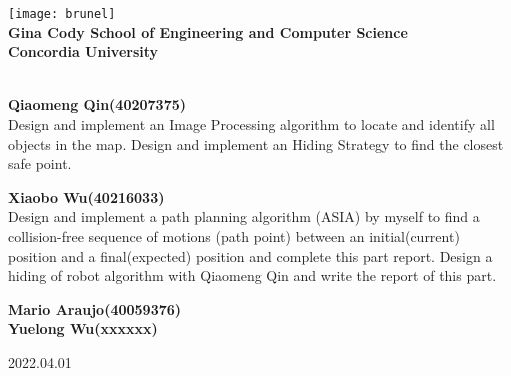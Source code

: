 \begin{titlepage}
  \begin{center}
    \texttt{[image: brunel]}\\[1cm]

    \textbf{\large Gina Cody School of Engineering and Computer Science}\\[0.5cm]

      \textbf{\LARGE Concordia University}\\[0.75cm]
      \textbf{\LARGE \Title}\\[0.75cm]

  \end{center}

\textbf{\large Qiaomeng Qin(40207375)}\\[0.5cm]
Design and implement an Image Processing algorithm to locate and identify all objects in the map. Design and implement an Hiding Strategy to find the closest safe point.

\textbf{\large Xiaobo Wu(40216033)}\\[0.5cm]
Design and implement a path planning algorithm (ASIA) by myself to find a collision-free sequence of motions (path point) between an initial(current) position and a final(expected) position and complete this part report. Design a hiding of robot algorithm with Qiaomeng Qin and write the report of this part.

\textbf{\large Mario Araujo(40059376)}\\[0.5cm]
\textbf{\large Yuelong Wu(xxxxxx)}\\[0.5cm]

\begin{center}
\textsc{\footnotesize{2022.04.01}}\\
\end{center}

\end{titlepage}

